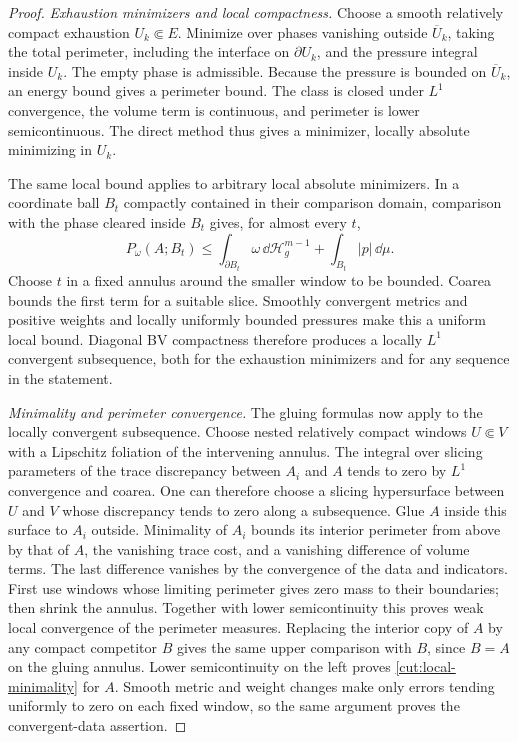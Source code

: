 \begin{proof}
\emph{Exhaustion minimizers and local compactness.}
Choose a smooth relatively compact exhaustion $U_k\Subset E$.
Minimize over phases vanishing outside $\overline U_k$, taking the total
perimeter, including the interface on $\partial U_k$, and the pressure
integral inside $U_k$.  The empty phase is admissible.  Because the
pressure is bounded on $\overline U_k$, an energy bound gives a perimeter
bound.  The class is closed under $L^1$ convergence, the volume term is
continuous, and perimeter is lower semicontinuous.  The direct method
thus gives a minimizer, locally absolute minimizing in $U_k$.

The same local bound applies to arbitrary local absolute minimizers.
In a coordinate ball $B_t$ compactly contained in their comparison
domain, comparison with the phase cleared inside $B_t$ gives, for almost
every $t$,
\[
 P_\omega(A;B_t)\le\int_{\partial B_t}\omega\,\dd\mathcal H_g^{m-1}
                         +\int_{B_t}|p|\,\dd\mu.
\]
Choose $t$ in a fixed annulus around the smaller window to be bounded.
Coarea bounds the first term for a suitable slice.  Smoothly convergent
metrics and positive weights and locally uniformly bounded pressures
make this a uniform local bound.  Diagonal BV compactness therefore
produces a locally $L^1$ convergent subsequence, both for the exhaustion
minimizers and for any sequence in the statement.

\emph{Minimality and perimeter convergence.}
The gluing formulas now apply to the locally convergent subsequence.
Choose nested relatively compact windows $U\Subset V$
with a Lipschitz foliation of the intervening annulus.  The integral over
slicing parameters of the trace discrepancy between $A_i$ and $A$ tends
to zero by $L^1$ convergence and coarea.  One can therefore choose a
slicing hypersurface between $U$ and $V$ whose discrepancy tends to zero
along a subsequence.  Glue $A$ inside this surface to $A_i$ outside.
Minimality of $A_i$ bounds its interior perimeter from above by that of
$A$, the vanishing trace cost, and a vanishing difference of volume
terms.  The last difference vanishes by the convergence of the data and
indicators.  First use windows whose limiting perimeter gives zero mass
to their boundaries; then shrink the annulus.  Together with lower
semicontinuity this proves weak local convergence of the perimeter
measures.  Replacing the interior copy of $A$ by any compact competitor
$B$ gives the same upper comparison with $B$, since $B=A$ on the gluing
annulus.  Lower semicontinuity on the left proves
\eqref{cut:local-minimality} for $A$.  Smooth metric and weight changes
make only errors tending uniformly to zero on each fixed window, so the
same argument proves the convergent-data assertion.


\end{proof}
